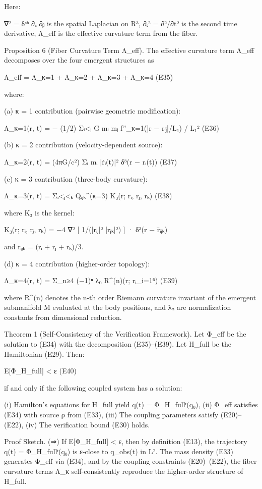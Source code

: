 Here:

    ∇² = δᵃᵇ ∂ₐ ∂ᵦ   is the spatial Laplacian on R³,
    ∂ₜ² = ∂²/∂t²     is the second time derivative,
    Λ_eff            is the effective curvature term from the fiber.


Proposition 6 (Fiber Curvature Term Λ_eff).
The effective curvature term Λ_eff decomposes over the four emergent
structures as

    Λ_eff = Λ_{κ=1} + Λ_{κ=2} + Λ_{κ=3} + Λ_{κ=4}   (E35)

where:

(a) κ = 1 contribution (pairwise geometric modification):

    Λ_{κ=1}(r, t) = − (1/2) Σᵢ<ⱼ  G mᵢ mⱼ f''_{κ=1}(|r − rᵢⱼ̄|/L₁) / L₁²   (E36)

(b) κ = 2 contribution (velocity-dependent source):

    Λ_{κ=2}(r, t) = (4πG/c²) Σᵢ mᵢ |ṙᵢ(t)|² δ³(r − rᵢ(t))      (E37)

(c) κ = 3 contribution (three-body curvature):

    Λ_{κ=3}(r, t) = Σᵢ<ⱼ<ₖ  Qᵢⱼₖ^{(κ=3)}  K₃(r; rᵢ, rⱼ, rₖ)   (E38)

where K₃ is the kernel:

    K₃(r; rᵢ, rⱼ, rₖ) = −4 ∇² [ 1/(|rᵢⱼ|² |rⱼₖ|²) ] · δ³(r − r̄ᵢⱼₖ)

and r̄ᵢⱼₖ = (rᵢ + rⱼ + rₖ)/3.

(d) κ = 4 contribution (higher-order topology):

    Λ_{κ=4}(r, t) = Σ_{n≥4}  (−1)ⁿ λₙ  R^{(n)}(r; {rᵢ}_{i=1}⁶)   (E39)

where R^{(n)} denotes the n-th order Riemann curvature invariant of the
emergent submanifold M evaluated at the body positions, and λₙ are
normalization constants from dimensional reduction.


Theorem 1 (Self-Consistency of the Verification Framework).
Let Φ_eff be the solution to (E34) with the decomposition (E35)–(E39).
Let H_{full} be the Hamiltonian (E29). Then:

    E[Φ_{H_{full}}] < ε                                    (E40)

if and only if the following coupled system has a solution:

    (i)   Hamilton's equations for H_{full} yield q(t) = Φ_{H_{full}}ᵗ(q₀),
    (ii)  Φ_eff satisfies (E34) with source ρ from (E33),
    (iii) The coupling parameters satisfy (E20)–(E22),
    (iv)  The verification bound (E30) holds.


Proof Sketch.
(⇒) If E[Φ_{H_{full}}] < ε, then by definition (E13), the trajectory
q(t) = Φ_{H_{full}}ᵗ(q₀) is ε-close to q_obs(t) in L². The mass density
(E33) generates Φ_eff via (E34), and by the coupling constraints
(E20)–(E22), the fiber curvature terms Λ_{κ} self-consistently reproduce
the higher-order structure of H_{full}.

